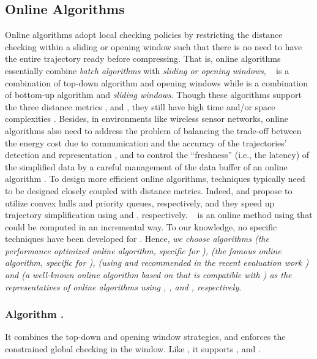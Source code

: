 \subsection{Online Algorithms}

Online \lsa algorithms adopt local checking policies by restricting the distance checking within a sliding or opening window such that there is no need to have the entire trajectory ready before compressing. That is, online algorithms essentially combine {\em batch algorithms} with {\em sliding or opening windows}, \eg\
\opwa \cite{Meratnia:Spatiotemporal} is a combination of top-down algorithm \dpa and opening windows while  \cite{Keogh:online} is a combination of bottom-up algorithm \tpa and \textit{sliding windows}.
%
Though these algorithms support the three distance metrics \ped, \sed and \dad, they still have high time and/or space complexities \cite{Liu:BQS}.
%
{Besides, in environments like wireless sensor networks, online algorithms also need to address the problem of balancing the trade-off between the energy cost due to communication and the accuracy of the trajectories' detection and representation \cite{Ghica:DTracking}, and to control the ``freshness'' (i.e., the latency) of the simplified data by a careful management of the data buffer of an online algorithm \cite{Ghica:DTracking}.}
%
To design more efficient online algorithms, techniques typically need to be designed closely coupled with distance metrics.
Indeed, \bqsa \cite{Liu:BQS} and \squishe \cite{Muckell:Compression} propose to utilize convex hulls and priority queues, respectively, and they speed up trajectory simplification using \ped and \sed, respectively.
{\dagots~\cite{Cao:Dots} is an online method using \lissed that could be computed in an incremental way.}
To our knowledge, no specific techniques have been developed for \dad.
Hence, {\em we choose algorithms \bqsa ({the performance optimized online algorithm, specific for \ped}), \squishe ({the famous online algorithm, specific for \sed}), {\dagots ({using \lissed and recommended in the recent evaluation work \cite{Zhang:Evaluation}})} and \opwa ({a well-known online algorithm based on \dpa that is compatible with \dad}) as the representatives of online algorithms using \ped, \sed, {\lissed} and \dad, respectively}.



\subsubsection{Algorithm \opwa \cite{Meratnia:Spatiotemporal}.}
It combines the top-down and opening window strategies, and enforces the constrained global checking in the window. Like \dpa, it supports \ped, \sed and \dad.


